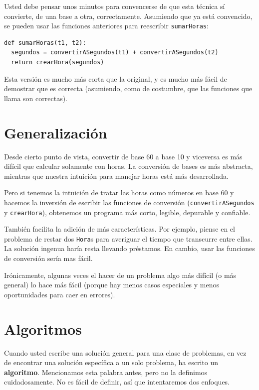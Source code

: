 Usted debe pensar unos minutos para convencerse de que esta técnica
sí convierte, de una base a otra, correctamente. Asumiendo que ya
está convencido, se pueden usar las funciones anteriores para reescribir
\texttt{sumarHoras}:

\begin{verbatim}
def sumarHoras(t1, t2):
  segundos = convertirASegundos(t1) + convertirASegundos(t2)
  return crearHora(segundos)
\end{verbatim}
 Esta versión es mucho más corta que la original, y es mucho más fácil
de demostrar que es correcta (asumiendo, como de costumbre, que las
funciones que llama son correctas).

\section{Generalización}


Desde cierto punto de vista, convertir de base 60 a base 10 y viceversa
es más difícil que calcular solamente con horas. La conversión de
bases es más abstracta, mientras que nuestra intuición para manejar
horas está más desarrollada.

Pero si tenemos la intuición de tratar las horas como números en base
60 y hacemos la inversión de escribir las funciones de conversión
(\texttt{convertirASegundos} y \texttt{crearHora}), obtenemos un programa
más corto, legible, depurable y confiable.

También facilita la adición de más características. Por ejemplo, piense
en el problema de restar dos \texttt{Hora}s para averiguar el tiempo
que transcurre entre ellas. La solución ingenua haría resta llevando
préstamos. En cambio, usar las funciones de conversión sería mas fácil.

Irónicamente, algunas veces el hacer de un problema algo más difícil
(o más general) lo hace más fácil (porque hay menos casos especiales
y menos oportunidades para caer en errores).

\section{Algoritmos}


Cuando usted escribe una solución general para una clase de problemas,
en vez de encontrar una solución específica a un solo problema, ha
escrito un \textbf{algoritmo}. Mencionamos esta palabra antes, pero
no la definimos cuidadosamente. No es fácil de definir, así que intentaremos
dos enfoques.

